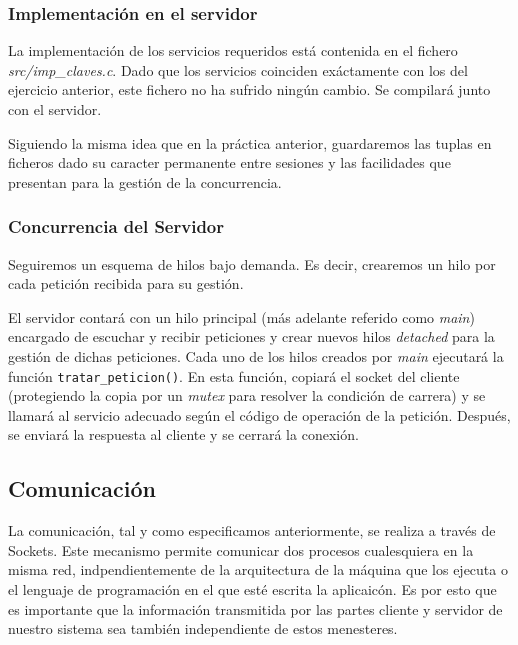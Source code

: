 \documentclass[]{article}
\begin{document}
\subsubsection{Implementación en el servidor}
\label{subsec::implementacion_servidor}

La implementación de los servicios requeridos está contenida en el fichero \textit{src/imp\_claves.c}. Dado que los servicios coinciden exáctamente con los del ejercicio anterior, este fichero no ha sufrido ningún cambio. Se compilará junto con el servidor. 

Siguiendo la misma idea que en la práctica anterior, guardaremos las tuplas en ficheros dado su caracter permanente entre sesiones y las facilidades que presentan para la gestión de la concurrencia.

\subsubsection{Concurrencia del Servidor}
\label{subsec::concurrencia_servidor}

Seguiremos un esquema de hilos bajo demanda. Es decir, crearemos un hilo por cada petición recibida para su gestión. 

El servidor contará con un hilo principal (más adelante referido como \textit{main}) encargado de escuchar y recibir peticiones y crear nuevos hilos \textit{detached} para la gestión de dichas peticiones. 
Cada uno de los hilos creados por \textit{main} ejecutará la función \texttt{tratar\_peticion()}. En esta función, copiará el socket del cliente (protegiendo la copia por un \textit{mutex} para resolver la condición de carrera) y se llamará al servicio adecuado según el código de operación de la petición. Después, se enviará la respuesta al cliente y se cerrará la conexión. 

\subsection{Comunicación}
\label{subsec:comunicacion}
La comunicación, tal y como especificamos anteriormente, se realiza a través de Sockets. Este mecanismo permite comunicar dos procesos cualesquiera en la misma red, indpendientemente de la arquitectura de la máquina que los ejecuta o el lenguaje de programación en el que esté escrita la aplicaicón. Es por esto que es importante que la información transmitida por las partes cliente y servidor de nuestro sistema sea también independiente de estos menesteres. 
\end{document}
